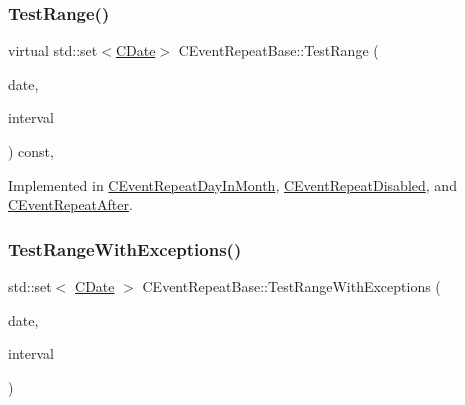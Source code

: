 \mbox{\label{class_c_event_repeat_base_ad8371820b1c9771c93b452e4c80f4cea}} 
\subsubsection{\texorpdfstring{Test\+Range()}{TestRange()}}
{\footnotesize\ttfamily virtual std\+::set$<$\mbox{\hyperlink{class_c_date}{C\+Date}}$>$ C\+Event\+Repeat\+Base\+::\+Test\+Range (\begin{DoxyParamCaption}\item[{const \mbox{\hyperlink{class_c_date}{C\+Date}} \&}]{date,  }\item[{const \mbox{\hyperlink{class_c_date_af23472c977b14ed341b48183ec19d874}{C\+Date\+::\+Interval}} \&}]{interval }\end{DoxyParamCaption}) const\hspace{0.3cm}{\ttfamily [protected]}, {}}



Implemented in \mbox{\hyperlink{class_c_event_repeat_day_in_month_a84de2696efb387af591bff04f37fd7ed}{C\+Event\+Repeat\+Day\+In\+Month}}, \mbox{\hyperlink{class_c_event_repeat_disabled_a0d9196c321d405660223d46c3c1ab27e}{C\+Event\+Repeat\+Disabled}}, and \mbox{\hyperlink{class_c_event_repeat_after_ad4a4b0da551d754d657a10723b39d13c}{C\+Event\+Repeat\+After}}.

\mbox{\label{class_c_event_repeat_base_aac49d254d10deaed38bd83fad747f3b9}} 
\subsubsection{\texorpdfstring{Test\+Range\+With\+Exceptions()}{TestRangeWithExceptions()}}
{\footnotesize\ttfamily std\+::set$<$ \mbox{\hyperlink{class_c_date}{C\+Date}} $>$ C\+Event\+Repeat\+Base\+::\+Test\+Range\+With\+Exceptions (\begin{DoxyParamCaption}\item[{const \mbox{\hyperlink{class_c_date}{C\+Date}} \&}]{date,  }\item[{const \mbox{\hyperlink{class_c_date_af23472c977b14ed341b48183ec19d874}{C\+Date\+::\+Interval}} \&}]{interval }\end{DoxyParamCaption})\hspace{0.3cm}{\ttfamily [virtual]}}

